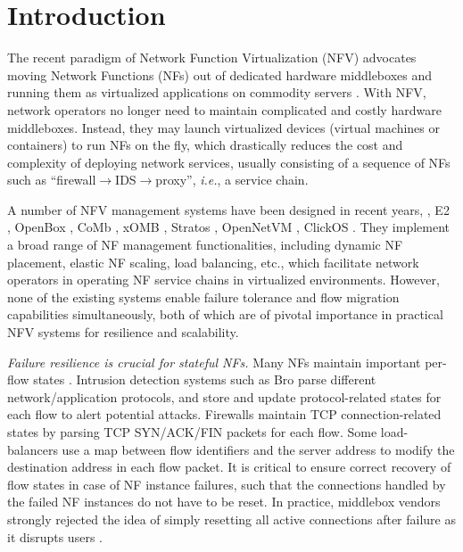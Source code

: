\section{Introduction}


The recent paradigm of Network Function Virtualization (NFV) advocates moving
Network Functions (NFs) out of dedicated hardware middleboxes and running them as
virtualized applications on commodity servers \cite{nfv-white-paper}. With NFV, network
operators no longer need to maintain complicated and costly hardware middleboxes. Instead,
they may launch virtualized devices (virtual machines or containers) to run NFs on the fly, which
drastically reduces the cost and complexity of deploying network services, usually consisting of a sequence of NFs such as ``firewall$\rightarrow$IDS$\rightarrow$proxy'', {\em i.e.}, a service chain.

A number of NFV management systems have been designed in recent years, \eg, E2 \cite{palkar2015e2}, OpenBox \cite{bremler2015openbox}, CoMb
\cite{sekar2012design}, xOMB \cite{anderson2012xomb}, Stratos
\cite{gember2012stratos}, OpenNetVM \cite{hwang2015netvm, zhang2016opennetvm}, ClickOS \cite{martins2014clickos}. They implement a
broad range of NF management functionalities, including %
 dynamic NF placement, elastic NF scaling,
load balancing, etc., which facilitate network operators in operating NF service chains in virtualized environments. However, none of the existing systems enable failure
tolerance \cite{rajagopalan2013pico, sherry2015rollback} and flow migration \cite{gember2015opennf, rajagopalan2013split, khalid2016paving} capabilities simultaneously, both of which are of pivotal importance in practical NFV systems for resilience and scalability.

{\em Failure resilience is crucial for stateful NFs.}  Many NFs maintain important per-flow states \cite{EnablingNF}. Intrusion
detection systems such as Bro \cite{bro} parse different network/application
protocols, and store and update protocol-related
states for each flow to alert potential attacks. Firewalls \cite{firewall}
maintain TCP connection-related states by parsing TCP SYN/ACK/FIN packets for
each flow. Some load-balancers \cite{lvs} use a map between flow identifiers and
the server address to modify the destination address in each flow packet.
It is critical to ensure correct recovery of flow states in case of NF instance failures, such that the connections handled by the failed NF instances do not have to be reset. In practice, middlebox vendors
strongly rejected the idea of simply resetting all active connections after failure as it
disrupts users \cite{sherry2015rollback}.

